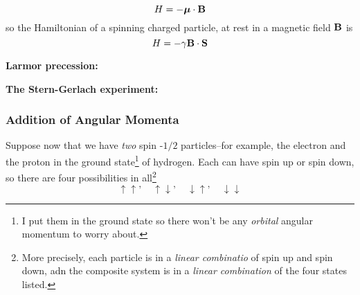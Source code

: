 \begin{equation}\label{4.157}
	H =-\vb*{\mu}\cdot\vb{B}
\end{equation}
so the Hamiltonian of a spinning charged particle, at rest in a magnetic field $\vb{B}$ is
\begin{equation}\label{4.158}
	H = -\gamma\vb{B}\cdot\vb{S}
\end{equation}

\begin{example}
	\textbf{Larmor precession:}
\end{example}

\begin{example}
	\textbf{The Stern-Gerlach experiment:}
\end{example}

\subsubsection{Addition of Angular Momenta}\label{sec:4.4.3}
Suppose now that we have \textit{two} spin -$1/2$ particles--for example, the electron and the proton in the ground state\footnote{I put them in the ground state so there won't be any \textit{orbital} angular momentum to worry about.} of hydrogen. Each can have spin up or spin down, so there are four possibilities in all\footnote{More precisely, each particle is in a \textit{linear combinatio} of spin up and spin down, adn the composite system is in a \textit{linear combination} of the four states listed.}
\begin{equation}\label{4.175}
	\uparrow\uparrow,\quad \uparrow\downarrow,\quad \downarrow\uparrow, \quad \downarrow\downarrow
\end{equation}

























